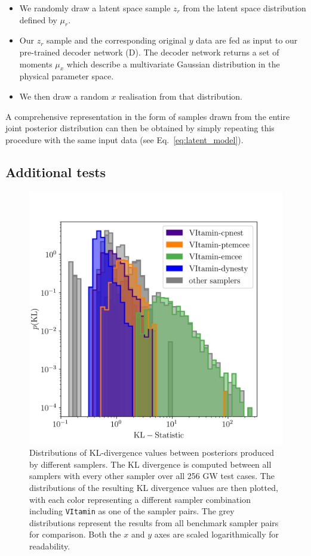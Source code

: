 \documentclass[%
showpacs,
 amsmath,amssymb,
 aps,
 twocolumn,
 prl,
 reprint,
floatfix,
]{revtex4-1}
\begin{document}
%
%
\begin{itemize}
%
\item We randomly draw a latent space sample $z_r$ from the latent space
distribution defined by $\mu_r$.
%
\item Our $z_r$ sample and the corresponding original $y$ data are fed as input to our
pre-trained decoder network (D). The decoder network returns a set of moments
$\mu_{x}$ which describe a multivariate Gaussian distribution in the physical
parameter space.
%
\item We then draw a random $x$ realisation from that distribution.
%
\end{itemize}
%

%
%
A comprehensive representation in the form of samples drawn from the entire joint
posterior distribution can then be obtained by simply repeating this procedure
with the same input data (see Eq.~\ref{eq:latent_model}).

%
%
\subsection{Additional tests}
%
\begin{figure}
    \includegraphics[width=\columnwidth]{images/hist-kl.png}
    \caption{\label{fig:kl_results} Distributions of \ac{KL}-divergence values
between posteriors produced by different samplers. The \ac{KL} divergence is
computed between all samplers with every other sampler over all 256 \ac{GW}
test cases. The distributions of the resulting \ac{KL} divergence values are
then plotted, with each color representing a different sampler combination
including \texttt{VItamin} as one of the sampler pairs. The grey distributions
represent the results from all benchmark sampler pairs for comparison. Both the
$x$ and $y$ axes are scaled logarithmically for readability.} 
\end{figure}
%
\end{document}
